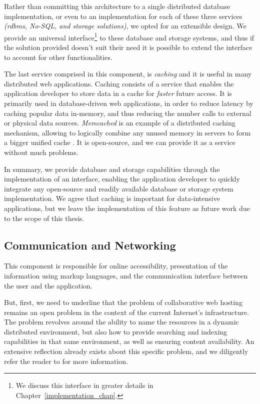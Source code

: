 \documentclass[12pt, titlepage]{uo_temp}
\begin{document}
     Rather than committing this architecture to a single distributed database
     implementation, or even to an implementation for each of these three services
     \emph{(\gls{rdbms}, No-SQL, and storage solutions)}, we opted for an
     extensible design. We provide an universal interface\footnote{We discuss this
       interface in greater details in Chapter~\ref{implementation_chap}.} to these
     database and storage systems, and thus if the solution provided doesn't suit their
     need it is possible to extend the interface to account for other functionalities.

     The last service comprised in this component, is \emph{caching} and it is useful in
     many distributed web applications. Caching consists of a service that enables the
     application developer to store data in a cache for \emph{faster} future access. It is
     primarily used in database-driven web applications, in order to reduce latency by
     caching popular data in-memory, and thus reducing the number calls to external or
     physical data sources. \emph{Memcached} is an example of a distributed caching
     mechanism, allowing to logically combine any unused memory in servers to form a
     bigger unified cache \cite{fitzpatrick2011memcached}. It is open-source, and we can
     provide it as a service without much problems.

     In summary, we provide database and storage capabilities through the implementation of
     an interface, enabling the application developer to quickly integrate any open-source
     and readily available database or storage system implementation. We agree that
     caching is important for data-intensive applications, but we leave the implementation
     of this feature as future work due to the scope of this thesis.

     \subsection{Communication and Networking}\label{arch_comm}
     This component is responsible for online accessibility,
     presentation of the information using markup languages, and the communication interface
     between the user and the application.

     But, first, we need to underline that the problem of collaborative web hosting
     remains an open problem in the context of the current Internet's infrastructure. The
     problem revolves around the ability to name the resources in a dynamic distributed
     environment, but also how to provide searching and indexing capabilities in that same
     environment, as well as ensuring content availability.  An extensive reflection
     already exists about this specific problem, and we diligently refer the reader to
     \cite{ahmed2014collaborative} for more information.
\end{document}
